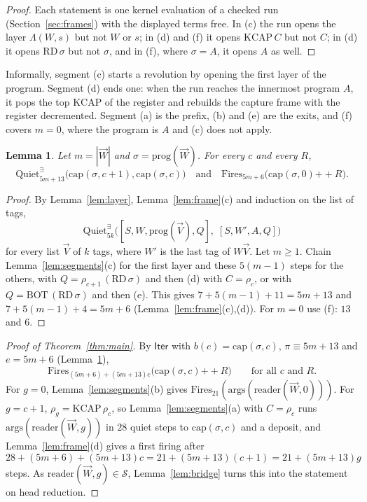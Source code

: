 \documentclass[11pt]{amsart}
\newtheorem{lemma}[theorem]{Lemma}
\theoremstyle{definition}
\newcommand{\Ter}{\mathcal S}
\newcommand{\app}{\mathbin{+\!\!+}}
\newcommand{\args}{\mathrm{args}}
\newcommand{\Fires}{\mathrm{Fires}}
\newcommand{\QuietD}{\mathrm{Quiet}^{\exists}}
\newcommand{\BOT}{\mathrm{BOT}}
\newcommand{\KCAP}{\mathrm{KCAP}}
\newcommand{\RD}{\mathrm{RD}}
\newcommand{\capf}{\mathrm{cap}}
\newcommand{\prog}{\mathrm{prog}}
\newcommand{\lam}{\Lambda}
\newcommand{\rd}{\mathrm{reader}}
\newcommand{\Iter}{\mathsf{Iter}}
\begin{document}
\begin{proof}
Each statement is one kernel evaluation of a checked run (Section~\ref{sec:frames}) with the
displayed terms free. In (c) the run opens the layer $\lam(W,s)$ but not $W$ or $s$; in (d) and
(f) it opens $\KCAP\,C$ but not $C$; in (d) it opens $\RD\,\sigma$ but not $\sigma$, and in (f),
where $\sigma=A$, it opens $A$ as well.
\end{proof}

Informally, segment (c) starts a revolution by opening the first layer of the program. Segment (d)
ends one: when the run reaches the innermost program $A$, it pops the top $\KCAP$ of the register
and rebuilds the capture frame with the register decremented. Segment (a) is the prefix, (b) and
(e) are the exits, and (f) covers $m=0$, where the program is $A$ and (c) does not apply.

\begin{lemma}\label{lem:rev}
Let $m=|\vec W|$ and $\sigma=\prog(\vec W)$. For every $c$ and every $R$,
\[
\QuietD_{5m+13}\bigl(\capf(\sigma,c+1),\capf(\sigma,c)\bigr)\quad\text{and}\quad
\Fires_{5m+6}\bigl(\capf(\sigma,0)\app R\bigr).
\]
\end{lemma}

\begin{proof}
By Lemma~\ref{lem:layer}, Lemma~\ref{lem:frame}(c) and induction on the list of tags,
\[
\QuietD_{5k}\bigl([S,W,\prog(\vec V),Q],\;[S,W',A,Q]\bigr)
\]
for every list $\vec V$ of $k$ tags, where $W'$ is the last tag of $W\vec V$. Let $m\ge1$.
Chain Lemma~\ref{lem:segments}(c) for the first layer and these $5(m-1)$ steps for the others,
with $Q=\rho_{c+1}\,(\RD\,\sigma)$ and then (d) with $C=\rho_c$, or with $Q=\BOT\,(\RD\,\sigma)$
and then (e). This gives $7+5(m-1)+11=5m+13$ and
$7+5(m-1)+4=5m+6$ (Lemma~\ref{lem:frame}(c),(d)). For $m=0$ use (f): $13$ and $6$.
\end{proof}

\begin{proof}[Proof of Theorem~\ref{thm:main}]
By $\Iter$ with $b(c)=\capf(\sigma,c)$, $\pi\equiv5m+13$ and $e=5m+6$ (Lemma~\ref{lem:rev}),
\[
\Fires_{(5m+6)+(5m+13)c}\bigl(\capf(\sigma,c)\app R\bigr)\qquad\text{for all $c$ and $R$.}
\]
For $g=0$, Lemma~\ref{lem:segments}(b) gives $\Fires_{21}(\args(\rd(\vec W,0)))$. For $g=c+1$,
$\rho_g=\KCAP\,\rho_c$, so Lemma~\ref{lem:segments}(a) with $C=\rho_c$ runs
$\args(\rd(\vec W,g))$ in $28$ quiet steps to $\capf(\sigma,c)$ and a deposit, and
Lemma~\ref{lem:frame}(d) gives a first firing after
\[
28+(5m+6)+(5m+13)c=21+(5m+13)(c+1)=21+(5m+13)g
\]
steps. As $\rd(\vec W,g)\in\Ter$, Lemma~\ref{lem:bridge} turns this into the statement on
head reduction.
\end{proof}
\end{document}
